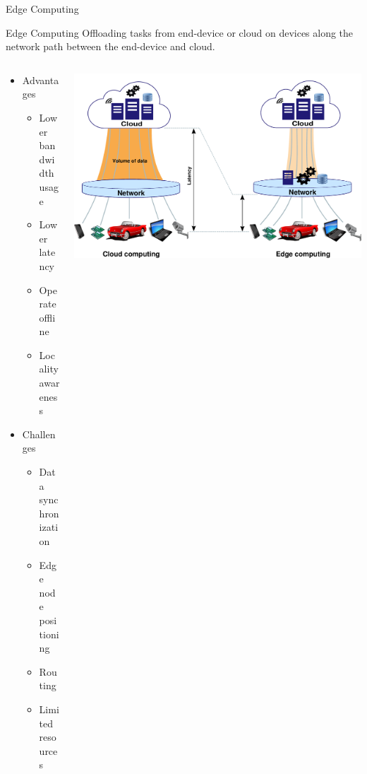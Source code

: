 \documentclass[10pt,xcolor={dvipsnames},notes]{beamer}
\begin{document}
\begin{frame}{Edge Computing}{}
\begin{block}{Edge Computing}
Offloading tasks from end-device or cloud on devices along the network path between the end-device and cloud.
\end{block}
\begin{columns}
    \begin{column}{0.38\textwidth}
        \begin{itemize}
            \item<2-> Advantages
            \begin{itemize}
                \item<2-> Lower bandwidth usage
                \item<2-> Lower latency
                \item<2-> Operate offline
                \item<2-> Locality awareness
            \end{itemize}
        \end{itemize}
        \begin{itemize}
            \item<3-> Challenges
            \begin{itemize}
                \item<3-> Data synchronization
                \item<3-> Edge node positioning
                \item<3-> Routing
                \item<3-> Limited resources
            \end{itemize}
        \end{itemize}
    \end{column}
    \begin{column}{0.72\textwidth}
        \includegraphics[width=\textwidth]{img/edge-arch.pdf}
    \end{column}
\end{columns}

\end{frame}
\end{document}
